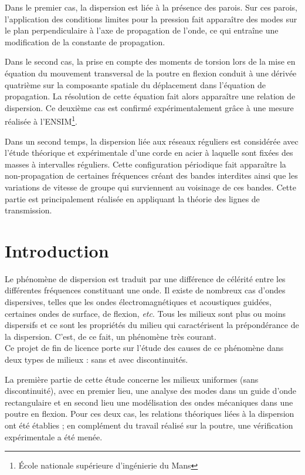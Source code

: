 \documentclass[a4paper,11pt]{report} %
\begin{document}
Dans le premier cas, la dispersion est liée à la présence des parois. Sur ces parois, l'application des conditions limites pour la pression fait apparaître des modes sur le plan perpendiculaire à l'axe de propagation de l'onde, ce qui entraîne une modification de la constante de propagation.

Dans le second cas, la prise en compte des moments de torsion lors de la mise en équation du mouvement transversal de la poutre en flexion conduit à une dérivée quatrième sur la composante spatiale du déplacement dans l'équation de propagation. La résolution de cette équation fait alors apparaître une relation de dispersion. Ce deuxième cas est confirmé expérimentalement grâce à une mesure réalisée à l'ENSIM\footnote{École nationale supérieure d’ingénierie du Mans}.

\bigskip
Dans un second temps, la dispersion liée aux réseaux réguliers est considérée avec l'étude théorique et expérimentale d'une corde en acier à laquelle sont fixées des masses à intervalles réguliers. Cette configuration périodique fait apparaître la non-propagation de certaines fréquences créant des bandes interdites ainsi que les variations de vitesse de groupe qui surviennent au voisinage de ces bandes. Cette partie est principalement réalisée en appliquant la théorie des lignes de transmission.



\chapter*{Introduction}

Le phénomène de dispersion est traduit par une différence de célérité entre les différentes fréquences constituant une onde.
Il existe de nombreux cas d'ondes dispersives, telles que les ondes électromagnétiques et acoustiques guidées, certaines ondes de surface, de flexion, \emph{etc}. Tous les milieux sont plus ou moins dispersifs et ce sont les propriétés du milieu qui caractérisent la prépondérance de la dispersion. C'est, de ce fait, un phénomène très courant. \\

Ce projet de fin de licence porte sur l'étude des causes de ce phénomène dans deux types de milieux : sans et avec discontinuités.


La première partie de cette étude concerne les milieux uniformes (sans discontinuité), avec en premier lieu, une analyse des modes dans un guide d'onde rectangulaire et en second lieu une modélisation des ondes mécaniques dans une poutre en flexion. Pour ces deux cas, les relations théoriques liées à la dispersion ont été établies ; en complément du travail réalisé sur la poutre, une vérification expérimentale a été menée.
 
\end{document}

